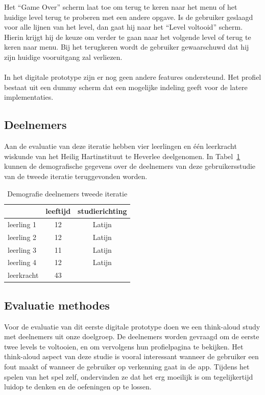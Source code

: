 \documentclass[11pt]{article}
\begin{document}
Het ``Game Over'' scherm laat toe om terug te keren naar het menu of het huidige level terug te proberen met een andere opgave. Is de gebruiker geslaagd voor alle lijnen van het level, dan gaat hij naar het ``Level voltooid'' scherm. Hierin krijgt hij de keuze om verder te gaan naar het volgende level of terug te keren naar menu. Bij het terugkeren wordt de gebruiker gewaarschuwd dat hij zijn huidige vooruitgang zal verliezen.\\\\
In het digitale prototype zijn er nog geen andere features ondersteund. Het profiel bestaat uit een dummy scherm dat een mogelijke indeling geeft voor de latere implementaties.
    
	\subsection{Deelnemers}
Aan de evaluatie van deze iteratie hebben vier leerlingen en \'e\'en leerkracht wiskunde van het Heilig Hartinstituut te Heverlee deelgenomen. In Tabel~\ref{demografie:tweede:iteratie} kunnen de demografische gegevens over de deelnemers van deze gebruikersstudie van de tweede iteratie teruggevonden worden.
	
    \begin{table}[H]
		\centering
		\begin{tabular}{|lcc|}
        	\hline
			& \textbf{leeftijd} & \textbf{studierichting} \\
            \hline
			leerling 1 & 12 & Latijn \\
			leerling 2 & 12 & Latijn \\
			leerling 3 & 11 & Latijn \\
			leerling 4 & 12 & Latijn \\
			leerkracht & 43 & \\
			\hline
		\end{tabular}
		\caption{Demografie deelnemers tweede iteratie}\label{demografie:tweede:iteratie}
    \end{table}
    
    \subsection{Evaluatie methodes}
Voor de evaluatie van dit eerste digitale prototype doen we een think-aloud study met deelnemers uit onze doelgroep. De deelnemers worden gevraagd om de eerste twee levels te voltooien, en om vervolgens hun profielpagina te bekijken. Het think-aloud aspect van deze studie is vooral interessant wanneer de gebruiker een fout maakt of wanneer de gebruiker op verkenning gaat in de app. Tijdens het spelen van het spel zelf, ondervinden ze dat het erg moeilijk is om tegelijkertijd luidop te denken en de oefeningen op te lossen.
\end{document}
